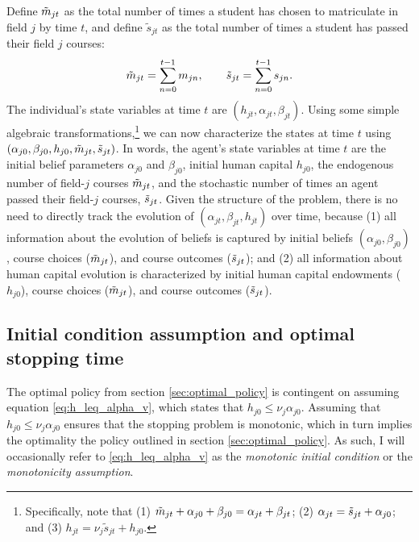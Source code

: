 Define $\tilde{m}_{jt}$ as the total number of times a student has chosen to matriculate in field $j$ by time $t$, and define $\tilde{s}_{jt}$ as the total number of times a student has passed their field $j$ courses:
\begin{equation}\label{eq:def_totals}
     \tilde{m}_{jt} = \sum_{n=0}^{t-1} m_{jn}, \quad \quad
     \tilde{s}_{jt} = \sum_{n=0}^{t-1} s_{jn}.
\end{equation} 
The individual's state variables at time $t$ are $(h_{jt}, \alpha_{jt}, \beta_{jt})$. 
Using some simple algebraic transformations,\footnote{
    Specifically, note that (1) $\tilde{m}_{jt} + \alpha_{j0} + \beta_{j0} = \alpha_{jt} + \beta_{jt}$; (2) $\alpha_{jt} = \tilde{s}_{jt} + \alpha_{j0}$; and (3) $h_{jt} = \nu_j \tilde{s}_{jt} + h_{j0}$.
} we can now characterize the states at time $t$ using $(\alpha_{j0}, \beta_{j0}, h_{j0}, \tilde{m}_{jt}, \tilde{s}_{jt})$.
In words, the agent's state variables at time $t$ are the initial belief parameters $\alpha_{j0}$ and $\beta_{j0}$, initial human capital $h_{j0}$, the endogenous number of field-$j$ courses $\tilde{m}_{jt}$, and the stochastic number of times an agent passed their field-$j$ courses, $\tilde{s}_{j t}$.
Given the structure of the problem, there is no need to directly track the evolution of $(\alpha_{jt}, \beta_{jt}, h_{jt})$ over time, because (1) all information about the evolution of beliefs is captured by initial beliefs $(\alpha_{j0}, \beta_{j0})$, course choices ($\tilde{m}_{jt}$), and course outcomes ($\tilde{s}_{jt}$); and (2) all information about human capital evolution is characterized by initial human capital endowments ($h_{j0}$), course choices ($\tilde{m}_{jt}$), and course outcomes ($\tilde{s}_{jt}$). 


\subsection{Initial condition assumption and optimal stopping time}\label{sec:initial_condition}


The optimal policy from section \ref{sec:optimal_policy} is contingent on assuming equation \eqref{eq:h_leq_alpha_v}, which states that $h_{j0} \leq \nu_j \alpha_{j0}$. 
Assuming that $h_{j0} \leq \nu_j \alpha_{j0}$ ensures that the stopping problem is monotonic, which in turn implies the optimality the policy outlined in section \ref{sec:optimal_policy}.
As such, I will occasionally refer to \eqref{eq:h_leq_alpha_v} as the \emph{monotonic initial condition} or the \emph{monotonicity assumption}. 

